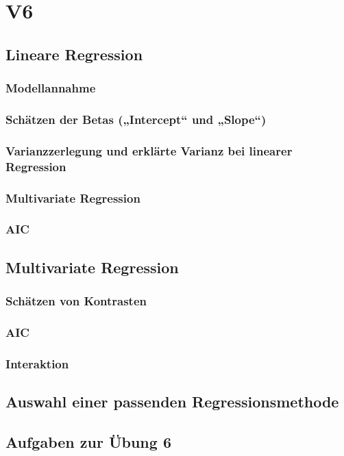 \section{V6}
\subsection{Lineare Regression}

\subsubsection{Modellannahme}

\subsubsection{Schätzen der Betas („Intercept“ und „Slope“)}

\subsubsection{Varianzzerlegung und erklärte Varianz bei linearer Regression}

\subsubsection{Multivariate Regression}

\subsubsection{AIC}

\subsection{Multivariate Regression}

\subsubsection{Schätzen von Kontrasten}

\subsubsection{AIC}

\subsubsection{Interaktion}

\subsection{Auswahl einer passenden Regressionsmethode}

\subsection{Aufgaben zur Übung 6}